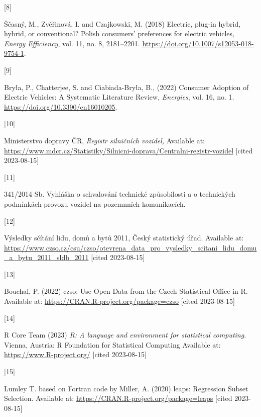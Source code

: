 \documentclass{mmeproc}
\newlength{\cslhangindent}
\newlength{\csllabelwidth}
\newenvironment{CSLReferences}[2] %
 {%
  \setlength{\parindent}{0pt}
  \ifodd #1
  \fi
  \setlength{\parskip}{-2pt}
 }%
 {}
\newcommand{\CSLLeftMargin}[1]{\parbox[t]{\csllabelwidth}{#1}}
\newcommand{\CSLRightInline}[1]{\parbox[t]{\linewidth - \csllabelwidth}{#1}\break}
\begin{document}
\begin{CSLReferences}{0}{0}
\leavevmode{}%
\CSLLeftMargin{{[}8{]} }%
\CSLRightInline{Ščasný, M., Zvěřinová, I. and Czajkowski, M. (2018) {Electric,
plug-in hybrid, hybrid, or conventional? {Polish} consumers' preferences
for electric vehicles,} \emph{Energy Efficiency}, vol. 11, no. 8, 2181--2201.
\url{https://doi.org/10.1007/s12053-018-9754-1}.}

\leavevmode{}%
\CSLLeftMargin{{[}9{]} }%
\CSLRightInline{Bryła, P., Chatterjee, S. and Ciabiada-Bryła, B., (2022)
{Consumer {Adoption} of {Electric} {Vehicles}: {A} {Systematic}
{Literature} {Review},} \emph{Energies}, vol. 16, no. 1.
\url{https://doi.org/10.3390/en16010205}.}

\leavevmode{}%
\CSLLeftMargin{{[}10{]} }%
\CSLRightInline{Ministerstvo dopravy ČR, \emph{Registr silničních
vozidel,} Available at:
\url{https://www.mdcr.cz/Statistiky/Silnicni-doprava/Centralni-registr-vozidel} {{[}cited 2023-08-15{]}}}

\leavevmode{}%
\CSLLeftMargin{{[}11{]} }%
\CSLRightInline{{341/2014 {Sb}. {Vyhláška} o schvalování technické
způsobilosti a o technických podmínkách provozu vozidel na pozemnních
komunikacích.} }

\leavevmode{}%
\CSLLeftMargin{{[}12{]} }%
\CSLRightInline{{Výsledky sčítání lidu, domů a bytů 2011}, Český statistický úřad. Available at:
\url{https://www.czso.cz/csu/czso/otevrena_data_pro_vysledky_scitani_lidu_domu_a_bytu_2011_sldb_2011} {{[}cited 2023-08-15{]}}}

\leavevmode{}%
\CSLLeftMargin{{[}13{]} }%
\CSLRightInline{Bouchal, P. (2022) {{czso}: {Use} {Open} {Data} from the
{Czech} {Statistical} {Office} in {R}.} Available at:
\url{https://CRAN.R-project.org/package=czso} {{[}cited 2023-08-15{]}}}

\leavevmode{}%
\CSLLeftMargin{{[}14{]} }%
\CSLRightInline{R Core Team (2023) \emph{R: A language and environment for
statistical computing}. Vienna, Austria: R Foundation for Statistical
Computing Available at: \url{https://www.R-project.org/} {{[}cited 2023-08-15{]}}}

\leavevmode{}%
\CSLLeftMargin{{[}15{]} }%
\CSLRightInline{Lumley T. based on Fortran code by Miller, A. (2020)
{{leaps}: {Regression} {Subset} {Selection}.} Available at:
\url{https://CRAN.R-project.org/package=leaps} {{[}cited 2023-08-15{]}}}


\end{CSLReferences}
\end{document}
